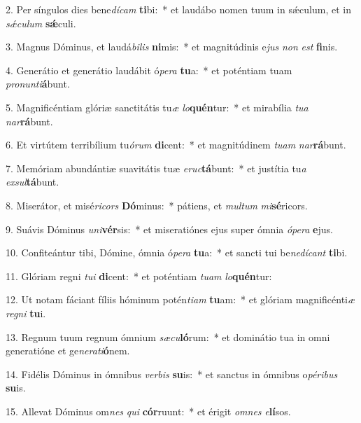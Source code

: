 2. Per síngulos dies bene\textit{dí}\textit{cam} \textbf{ti}bi:~*  et laudábo nomen tuum in sǽculum, et in \textit{sǽ}\textit{cu}\textit{lum} \textbf{sǽ}culi.\

3. Magnus Dóminus, et laudá\textit{bi}\textit{lis} \textbf{ni}mis:~*  et magnitúdinis e\textit{jus} \textit{non} \textit{est} \textbf{fi}nis.\

4. Generátio et generátio laudábit ó\textit{pe}\textit{ra} \textbf{tu}a:~*  et poténtiam tuam \textit{pro}\textit{nun}\textit{ti}\textbf{á}bunt.\

5. Magnificéntiam glóriæ sanctitátis tu\textit{æ} \textit{lo}\textbf{quén}tur:~*  et mirabília \textit{tu}\textit{a} \textit{nar}\textbf{rá}bunt.\

6. Et virtútem terribílium tu\textit{ó}\textit{rum} \textbf{di}cent:~*  et magnitúdinem \textit{tu}\textit{am} \textit{nar}\textbf{rá}bunt.\

7. Memóriam abundántiæ suavitátis tuæ \textit{e}\textit{ruc}\textbf{tá}bunt:~*  et justítia tu\textit{a} \textit{ex}\textit{sul}\textbf{tá}bunt.\

8. Miserátor, et misé\textit{ri}\textit{cors} \textbf{Dó}minus:~*  pátiens, et \textit{mul}\textit{tum} \textit{mi}\textbf{sé}ricors.\

9. Suávis Dóminus \textit{u}\textit{ni}\textbf{vér}sis:~*  et miseratiónes ejus super ómnia \textit{ó}\textit{pe}\textit{ra} \textbf{e}jus.\

10. Confiteántur tibi, Dómine, ómnia ó\textit{pe}\textit{ra} \textbf{tu}a:~*  et sancti tui be\textit{ne}\textit{dí}\textit{cant} \textbf{ti}bi.\

11. Glóriam regni \textit{tu}\textit{i} \textbf{di}cent:~*  et poténtiam \textit{tu}\textit{am} \textit{lo}\textbf{quén}tur:\

12. Ut notam fáciant fíliis hóminum potén\textit{ti}\textit{am} \textbf{tu}am:~*  et glóriam magnificénti\textit{æ} \textit{re}\textit{gni} \textbf{tu}i.\

13. Regnum tuum regnum ómnium \textit{sæ}\textit{cu}\textbf{ló}rum:~*  et dominátio tua in omni generatióne et ge\textit{ne}\textit{ra}\textit{ti}\textbf{ó}nem.\

14. Fidélis Dóminus in ómnibus \textit{ver}\textit{bis} \textbf{su}is:~*  et sanctus in ómnibus o\textit{pé}\textit{ri}\textit{bus} \textbf{su}is.\

15. Allevat Dóminus om\textit{nes} \textit{qui} \textbf{cór}ruunt:~*  et érigit \textit{om}\textit{nes} \textit{e}\textbf{lí}sos.\

